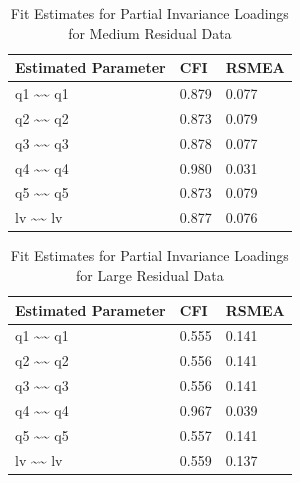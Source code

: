 \documentclass[
  man,floatsintext]{apa7}
\begin{document}
\begin{table}[tbp]

\begin{center}
\begin{threeparttable}

\caption{\label{tab:p-tab19}Fit Estimates for Partial Invariance Loadings for Medium Residual Data}

\begin{tabular}{lll}
\toprule
Estimated Parameter & CFI & RSMEA\\
\midrule
q1 \textasciitilde{}\textasciitilde{} q1 & 0.879 & 0.077\\
q2 \textasciitilde{}\textasciitilde{} q2 & 0.873 & 0.079\\
q3 \textasciitilde{}\textasciitilde{} q3 & 0.878 & 0.077\\
q4 \textasciitilde{}\textasciitilde{} q4 & 0.980 & 0.031\\
q5 \textasciitilde{}\textasciitilde{} q5 & 0.873 & 0.079\\
lv \textasciitilde{}\textasciitilde{} lv & 0.877 & 0.076\\
\bottomrule
\end{tabular}

\end{threeparttable}
\end{center}

\end{table}

\begin{table}[tbp]

\begin{center}
\begin{threeparttable}

\caption{\label{tab:p-tab20}Fit Estimates for Partial Invariance Loadings for Large Residual Data}

\begin{tabular}{lll}
\toprule
Estimated Parameter & CFI & RSMEA\\
\midrule
q1 \textasciitilde{}\textasciitilde{} q1 & 0.555 & 0.141\\
q2 \textasciitilde{}\textasciitilde{} q2 & 0.556 & 0.141\\
q3 \textasciitilde{}\textasciitilde{} q3 & 0.556 & 0.141\\
q4 \textasciitilde{}\textasciitilde{} q4 & 0.967 & 0.039\\
q5 \textasciitilde{}\textasciitilde{} q5 & 0.557 & 0.141\\
lv \textasciitilde{}\textasciitilde{} lv & 0.559 & 0.137\\
\bottomrule
\end{tabular}

\end{threeparttable}
\end{center}

\end{table}
\end{document}
